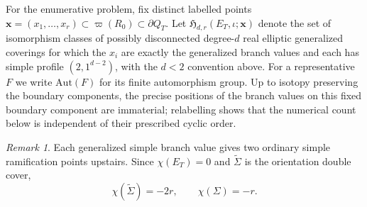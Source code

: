 \documentclass[11pt,a4paper,reqno]{article}
\theoremstyle{definition}
\theoremstyle{remark}
\newtheorem{remark}[theorem]{Remark}
\newcommand\Aut{{\mathrm{Aut}}}
\begin{document}
For the enumerative problem, fix distinct labelled points $\mathbf x=(x_1,\ldots,x_r)\subset \varpi(R_0)\subset\partial Q_T$.  Let $\mathfrak H_{d,r}(E_T,\iota;\mathbf x)$ denote the set of isomorphism classes of possibly disconnected degree-$d$ real elliptic generalized coverings for which the $x_i$ are exactly the generalized branch values and each has simple profile $(2,1^{d-2})$, with the $d<2$ convention above.  For a representative $F$ we write $\Aut(F)$ for its finite automorphism group.  Up to isotopy preserving the boundary components, the precise positions of the branch values on this fixed boundary component are immaterial; relabelling shows that the numerical count below is independent of their prescribed cyclic order.

\begin{remark}
Each generalized simple branch value gives two ordinary simple ramification points upstairs.  Since $\chi(E_T)=0$ and $\widetilde\Sigma$ is the orientation double cover,
\begin{equation}\label{eq:real-RH}
\chi(\widetilde\Sigma)=-2r, \qquad \chi(\Sigma)=-r.
\end{equation}
\end{remark}
\end{document}
